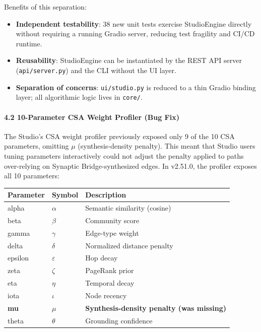 Benefits of this separation:
\begin{itemize}
\item \textbf{Independent testability}: 38 new unit tests exercise StudioEngine directly without requiring a running Gradio server, reducing test fragility and CI/CD runtime.
\item \textbf{Reusability}: StudioEngine can be insta\-ntiated by the REST API server (\texttt{api/server.py}) and the CLI without the UI layer.
\item \textbf{Separation of concerns}: \texttt{ui/studio.py} is reduced to a thin Gradio binding layer; all algorithmic logic lives in \texttt{core/}.

\end{itemize}
\paragraph{4.2 10-Parameter CSA Weight Profiler (Bug Fix)}
The Studio's CSA weight profiler previously exposed only 9 of the 10 CSA parameters, omitting $\mu$ (synthesis-density penalty). This meant that Studio users tuning parameters inter\-actively could not adjust the penalty applied to paths over-relying on Synaptic Bridge-synthesized edges. In v2.51.0, the profiler exposes all 10 parameters:

\begin{center}
{\footnotesize
\begin{tabularx}{\columnwidth}{|>{\raggedright\arraybackslash}X|>{\raggedright\arraybackslash}X|>{\raggedright\arraybackslash}X|}
\hline
Parameter & Symbol & Description \\ \hline
alpha & $\alpha$ & Semantic similarity (cosine) \\ \hline
beta & $\beta$ & Community score \\ \hline
gamma & $\gamma$ & Edge-type weight \\ \hline
delta & $\delta$ & Normalized distance penalty \\ \hline
epsilon & $\varepsilon$ & Hop decay \\ \hline
zeta & $\zeta$ & PageRank prior \\ \hline
eta & $\eta$ & Temporal decay \\ \hline
iota & $\iota$ & Node recency \\ \hline
\textbf{mu} & \textbf{$\mu$} & \textbf{Synthesis-density penalty (was missing)} \\ \hline
theta & $\theta$ & Grounding confidence \\ \hline
\end{tabularx}
}
\end{center}

